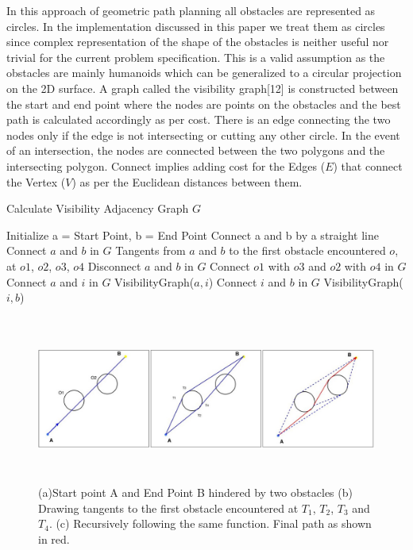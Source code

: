 \documentclass[letterpaper, 10 pt, conference]{ieeeconf}  %
\begin{document}
In this approach of geometric path planning all obstacles are represented as circles. In the  implementation discussed in this paper we treat them as circles since complex representation of the shape of the obstacles is neither useful nor trivial for the current problem specification. This is a valid assumption as the obstacles are mainly humanoids which can be generalized to a circular projection on the 2D surface. A graph called the visibility graph[12] is constructed between the start and end point where the nodes are points on the obstacles and the best path is calculated accordingly as per cost. There is an edge connecting the two nodes only if the edge is not intersecting or cutting any other circle. In the event of an intersection, the nodes
are connected between the two polygons and the intersecting polygon. Connect implies adding cost for the Edges ($E$) that connect the Vertex ($V$) as per the Euclidean distances between them.

\begin{algorithm}
\caption{Calculate Visibility Adjacency Graph $G$}
\begin{algorithmic}[1]
\State Initialize a = Start Point, b = End Point
\State Connect a and b by a straight line
\State Connect $a$ and $b$ in $G$ 
\State Tangents from $a$ and $b$ to the first obstacle
encountered $o$, at $o1$, $o2$, $o3$, $o4$
\State Disconnect $a$ and $b$ in $G$
\State Connect $o1$ with $o3$ and $o2$ with $o4$ in $G$
\State Connect $a$ and $i$ in $G$
\State VisibilityGraph($a,i$)
\EndFor
{}
\State Connect $i$ and $b$ in $G$
\State VisibilityGraph($i,b$)
\EndFor
\EndIf
\EndProcedure
\end{algorithmic}
\end{algorithm}



\begin{figure} 
\centering
\includegraphics[width=\textwidth,height=5.5cm]{path_paper.jpg}
\caption{(a)Start point A and End Point B hindered by two obstacles (b) Drawing tangents to the first obstacle encountered at $T_{1}$, $T_{2}$, $T_{3}$ and $T_{4}$. (c) Recursively following the same function. Final path as shown in red. }
\end{figure}
\end{document}
